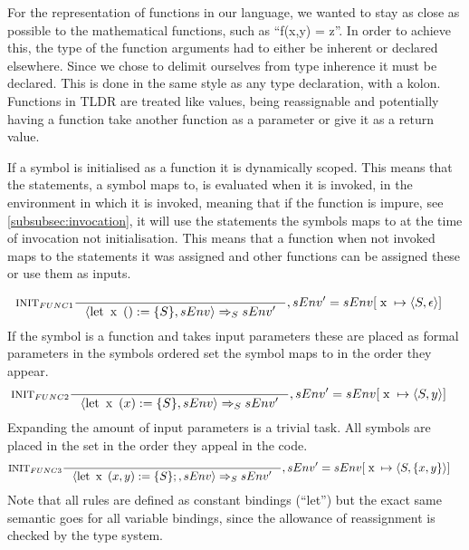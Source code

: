 For the representation of functions in our language, we wanted to stay as close as possible to the mathematical functions, such as \enquote{f(x,y) = z}. In order to achieve this, the type of the function arguments had to either be inherent or declared elsewhere. Since we chose to delimit ourselves from type inherence it must be declared. This is done in the same style as any type declaration, with a kolon. Functions in TLDR are treated like values, being reassignable and potentially having a function take another function as a parameter or give it as a return value.

If a symbol is initialised as a function it is dynamically scoped. This means that the statements, a symbol maps to, is evaluated when it is invoked, in the environment in which it is invoked, meaning that if the function is impure, see \cref{subsubsec:invocation}, it will use the statements the symbols maps to at the time of invocation not initialisation. This means that a function when not invoked maps to the statements it was assigned and other functions can be assigned these or use them as inputs.

\begin{align*}
&\inference[$\text{INIT}_{FUNC1}$]{}
                         {\Braket{\Tlet \Tx() := \{S\},sEnv} \Rightarrow_S sEnv'}
												 {, sEnv' = sEnv[\Tx \mapsto \Braket{S,\epsilon}]}
\end{align*}
If the symbol is a function and takes input parameters these are placed as formal parameters in the symbols ordered set the symbol maps to in the order they appear.
\begin{align*}
&\inference[$\text{INIT}_{FUNC2}$]{}
                         {\Braket{\Tlet \Tx(x) := \{S\},sEnv} \Rightarrow_S sEnv'}
												 {, sEnv' = sEnv[\Tx \mapsto \Braket{S,y}]}
\end{align*}
Expanding the amount of input parameters is a trivial task. All symbols are placed in the set in the order they appeal in the code. 
\begin{align*}
&\inference[$\text{INIT}_{FUNC3}$]{}
                         {\Braket{\Tlet \Tx(x,y) := \{S\};,sEnv} \Rightarrow_S sEnv'}
												 {, sEnv' = sEnv[\Tx \mapsto \Braket{S,\{x,y\}}]}
\end{align*}
Note that all rules are defined as constant bindings (\enquote{let}) but the exact same semantic goes for all variable bindings, since the allowance of reassignment is checked by the type system.

